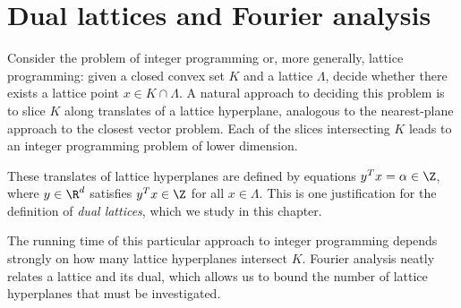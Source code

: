 %
%
%

\chapter{Dual lattices and Fourier analysis}

Consider the problem of integer programming or, more generally, lattice programming:
given a closed convex set $K$ and a lattice $\Lambda$,
decide whether there exists a lattice point $x \in K \cap \Lambda$.
A natural approach to deciding this problem
is to slice $K$ along translates of a lattice hyperplane,
analogous to the nearest-plane approach to the closest vector problem.
Each of the slices intersecting $K$ leads to an integer programming problem
of lower dimension.
\begin{center}
\end{center}
These translates of lattice hyperplanes are defined by equations $y^Tx = \alpha \in \Z$,
where $y \in \R^d$ satisfies $y^Tx \in \Z$ for all $x \in \Lambda$.
This is one justification for the definition of \emph{dual lattices},
which we study in this chapter.

The running time of this particular approach to integer programming
depends strongly on how many lattice hyperplanes intersect $K$.
Fourier analysis neatly relates a lattice and its dual,
which allows us to bound the number of lattice hyperplanes that must be investigated.


